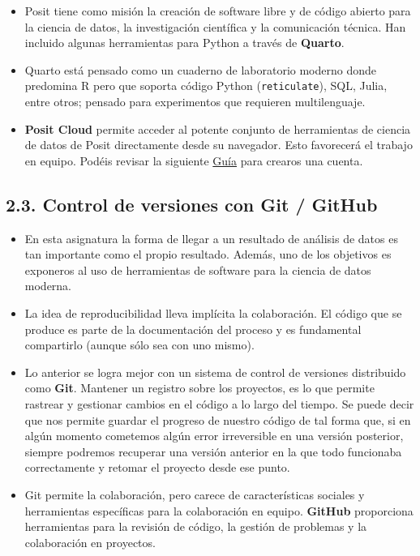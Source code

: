 \documentclass[
  letterpaper,
  DIV=11,
  numbers=noendperiod]{scrreprt}
\begin{document}
\begin{itemize}
\item
  Posit tiene como misión la creación de software libre y de código
  abierto para la ciencia de datos, la investigación científica y la
  comunicación técnica. Han incluido algunas herramientas para Python a
  través de \textbf{Quarto}.
\item
  Quarto está pensado como un cuaderno de laboratorio moderno donde
  predomina R pero que soporta código Python (\texttt{reticulate}), SQL,
  Julia, entre otros; pensado para experimentos que requieren
  multilenguaje.
\item
  \textbf{Posit Cloud} permite acceder al potente conjunto de
  herramientas de ciencia de datos de Posit directamente desde su
  navegador. Esto favorecerá el trabajo en equipo. Podéis revisar la
  siguiente \href{https://posit.cloud/learn/guide}{Guía} para crearos
  una cuenta.
\end{itemize}

\hypertarget{control-de-versiones-con-git-github}{%
\subsection{2.3. Control de versiones con Git /
GitHub}\label{control-de-versiones-con-git-github}}

\begin{itemize}
\item
  En esta asignatura la forma de llegar a un resultado de análisis de
  datos es tan importante como el propio resultado. Además, uno de los
  objetivos es exponeros al uso de herramientas de software para la
  ciencia de datos moderna.
\item
  La idea de reproducibilidad lleva implícita la colaboración. El código
  que se produce es parte de la documentación del proceso y es
  fundamental compartirlo (aunque sólo sea con uno mismo).
\item
  Lo anterior se logra mejor con un sistema de control de versiones
  distribuido como \textbf{Git}. Mantener un registro sobre los
  proyectos, es lo que permite rastrear y gestionar cambios en el código
  a lo largo del tiempo. Se puede decir que nos permite guardar el
  progreso de nuestro código de tal forma que, si en algún momento
  cometemos algún error irreversible en una versión posterior, siempre
  podremos recuperar una versión anterior en la que todo funcionaba
  correctamente y retomar el proyecto desde ese punto.
\item
  Git permite la colaboración, pero carece de características sociales y
  herramientas específicas para la colaboración en equipo.
  \textbf{GitHub} proporciona herramientas para la revisión de código,
  la gestión de problemas y la colaboración en proyectos.
\end{itemize}
\end{document}

